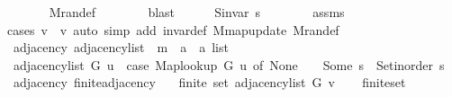 \begin{isabellebody}
\ \ \ \ \ \ \isamarkupfalse%
\ M{\isachardot}{\kern0pt}ran{\isacharunderscore}{\kern0pt}def\isanewline
\ \ \ \ \ \ \isamarkupfalse%
\ blast\isanewline
\ \ \ \ \isamarkupfalse%
\ {\isachardoublequoteopen}S{\isachardot}{\kern0pt}invar\ s{\isacharprime}{\kern0pt}{\isachardoublequoteclose}\isanewline
\ \ \ \ \ \ \isamarkupfalse%
\ assms\isanewline
\ \ \ \ \ \ \isamarkupfalse%
\ {\isacharparenleft}{\kern0pt}cases\ {\isachardoublequoteopen}v{\isacharprime}{\kern0pt}\ {\isacharequal}{\kern0pt}\ v{\isachardoublequoteclose}{\isacharparenright}{\kern0pt}\ {\isacharparenleft}{\kern0pt}auto\ simp\ add{\isacharcolon}{\kern0pt}\ invar{\isacharunderscore}{\kern0pt}def\ M{\isachardot}{\kern0pt}map{\isacharunderscore}{\kern0pt}update\ M{\isachardot}{\kern0pt}ran{\isacharunderscore}{\kern0pt}def{\isacharparenright}{\kern0pt}\isanewline
\ \ \isamarkupfalse%
\isanewline
{}\isamarkupfalse%
%
\endisatagproof
{\isafoldproof}%
%
\isadelimproof
\isanewline
%
\endisadelimproof
\isanewline
{}\isamarkupfalse%
\ {\isacharparenleft}{\kern0pt}\ adjacency{\isacharparenright}{\kern0pt}\ adjacency{\isacharunderscore}{\kern0pt}list\ {\isacharcolon}{\kern0pt}{\isacharcolon}{\kern0pt}\ {\isachardoublequoteopen}{\isacharprime}{\kern0pt}m\ {\isasymRightarrow}\ {\isacharprime}{\kern0pt}a\ {\isasymRightarrow}\ {\isacharprime}{\kern0pt}a\ list{\isachardoublequoteclose}\ \isanewline
\ \ {\isachardoublequoteopen}adjacency{\isacharunderscore}{\kern0pt}list\ G\ u\ {\isasymequiv}\ case\ Map{\isacharunderscore}{\kern0pt}lookup\ G\ u\ of\ None\ {\isasymRightarrow}\ {\isacharbrackleft}{\kern0pt}{\isacharbrackright}{\kern0pt}\ {\isacharbar}{\kern0pt}\ Some\ s\ {\isasymRightarrow}\ Set{\isacharunderscore}{\kern0pt}inorder\ s{\isachardoublequoteclose}\isanewline
\isanewline
{}\isamarkupfalse%
\ {\isacharparenleft}{\kern0pt}\ adjacency{\isacharparenright}{\kern0pt}\ finite{\isacharunderscore}{\kern0pt}adjacency{\isacharcolon}{\kern0pt}\isanewline
\ \ \ {\isachardoublequoteopen}finite\ {\isacharparenleft}{\kern0pt}set\ {\isacharparenleft}{\kern0pt}adjacency{\isacharunderscore}{\kern0pt}list\ G\ v{\isacharparenright}{\kern0pt}{\isacharparenright}{\kern0pt}{\isachardoublequoteclose}\isanewline
%
\isadelimproof
\ \ %
\endisadelimproof
%
\isatagproof
{}\isamarkupfalse%
\ finite{\isacharunderscore}{\kern0pt}set\isanewline
\ \ \isacommand{{\isachardot}{\kern0pt}}\isamarkupfalse%
%
\endisatagproof

\end{isabellebody}
